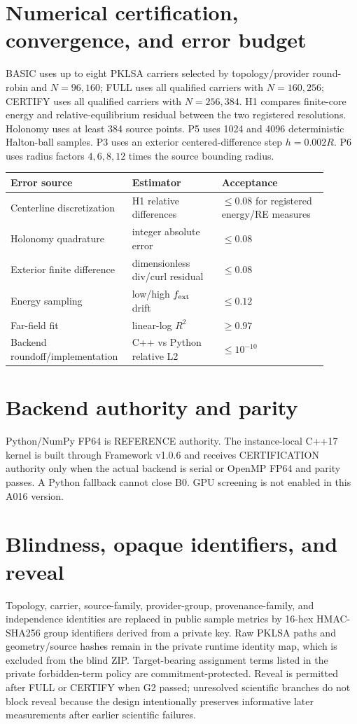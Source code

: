\documentclass[11pt,a4paper]{article}
\begin{document}
\section{Numerical certification, convergence, and error budget}
BASIC uses up to eight PKLSA carriers selected by topology/provider round-robin and $N=96,160$; FULL uses all qualified carriers with $N=160,256$; CERTIFY uses all qualified carriers with $N=256,384$. H1 compares finite-core energy and relative-equilibrium residual between the two registered resolutions. Holonomy uses at least 384 source points. P5 uses 1024 and 4096 deterministic Halton-ball samples. P3 uses an exterior centered-difference step $h=0.002R$. P6 uses radius factors $4,6,8,12$ times the source bounding radius.

\begin{longtable}{p{0.31\linewidth}p{0.27\linewidth}p{0.32\linewidth}}
\toprule
Error source & Estimator & Acceptance \\
\midrule
Centerline discretization & H1 relative differences & $\le0.08$ for registered energy/RE measures \\
Holonomy quadrature & integer absolute error & $\le0.08$ \\
Exterior finite difference & dimensionless div/curl residual & $\le0.08$ \\
Energy sampling & low/high $f_{\rm ext}$ drift & $\le0.12$ \\
Far-field fit & linear-log $R^2$ & $\ge0.97$ \\
Backend roundoff/implementation & C++ vs Python relative L2 & $\le10^{-10}$ \\
\bottomrule
\end{longtable}

\section{Backend authority and parity}
Python/NumPy FP64 is REFERENCE authority. The instance-local C++17 kernel is built through Framework v1.0.6 and receives CERTIFICATION authority only when the actual backend is serial or OpenMP FP64 and parity passes. A Python fallback cannot close B0. GPU screening is not enabled in this A016 version.

\section{Blindness, opaque identifiers, and reveal}
Topology, carrier, source-family, provider-group, provenance-family, and independence identities are replaced in public sample metrics by 16-hex HMAC-SHA256 group identifiers derived from a private key. Raw PKLSA paths and geometry/source hashes remain in the private runtime identity map, which is excluded from the blind ZIP. Target-bearing assignment terms listed in the private forbidden-term policy are commitment-protected. Reveal is permitted after FULL or CERTIFY when G2 passed; unresolved scientific branches do not block reveal because the design intentionally preserves informative later measurements after earlier scientific failures.
\end{document}
